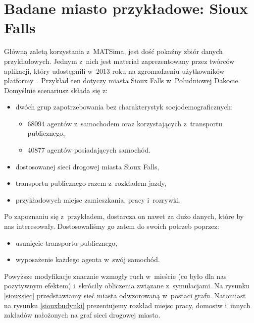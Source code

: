 \documentclass[twoside,12pt]{report}
\begin{document}
\section{Badane miasto przykładowe: Sioux Falls}

Główną zaletą korzystania z~MATSima, jest dość pokaźny zbiór danych przykładowych. Jednym z~nich jest materiał zaprezentowany przez twórców aplikacji, który udostępnili w~2013 roku na zgromadzeniu użytkowników platformy~\cite{siux}. Przykład ten dotyczy miasta Sioux Falls w~Południowej Dakocie. Domyślnie scenariusz składa się z:

\begin{itemize}
\item dwóch grup zapotrzebowania bez charakterystyk socjodemograficznych:
\begin{itemize}
\item 68094 agentów z~samochodem oraz korzystających z~transportu publicznego,
\item 40877 agentów posiadających samochód.
\end{itemize}
\item dostosowanej sieci drogowej miasta Sioux Falls,
\item transportu publicznego razem z~rozkładem jazdy,
\item przykładowych miejsc zamieszkania, pracy i~rozrywki.
\end{itemize}

\vspace*{20px}
Po zapoznaniu się z~przykładem, dostarcza on nawet za dużo danych, które by nas interesowały. Dostosowaliśmy go zatem do swoich potrzeb poprzez:

\begin{itemize}
\item usunięcie transportu publicznego,
\item wyposażenie każdego agenta w~swój samochód.
\end{itemize}

Powyższe modyfikacje znacznie wzmogły ruch w~mieście (co było dla nas pozytywnym efektem) i~skróciły obliczenia związane z~symulacjami. Na rysunku \ref{siouxsiec} przedstawiamy sieć miasta odwzorowaną w~postaci grafu. Natomiast na rysunku \ref{siouxbudynki}  prezentujemy  rozkład miejsc pracy, domostw i~innych zakładów nałożonych na graf sieci drogowej miasta.
\end{document}
